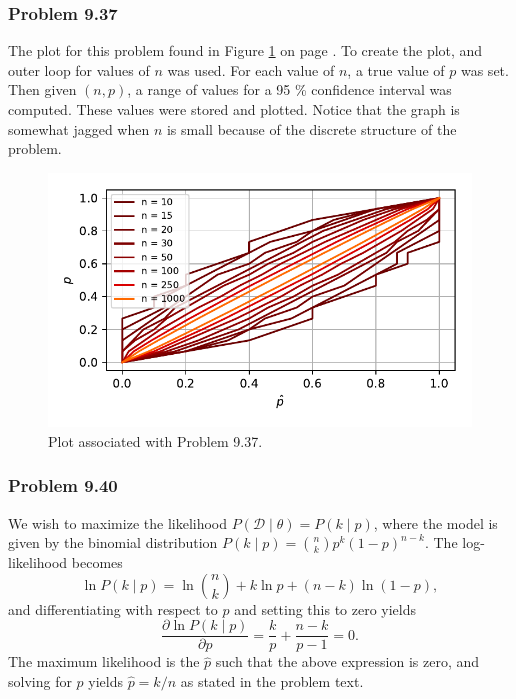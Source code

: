 \documentclass[12pt, a4paper]{article}
\newcommand{\D}{\mathcal{D}}
\begin{document}
{\subsubsection*{Problem 9.37}
The plot for this problem found in Figure \ref{fig:duda_ch9_prob37_k50} on page \pageref{fig:duda_ch9_prob37_k50}.
To create the plot, and outer loop for values of $n$ was used.
For each value of $n$, a true value of $p$ was set.
Then given $(n, p)$, a range of values for a 95 \% confidence interval was computed.
These values were stored and plotted.
Notice that the graph is somewhat jagged when $n$ is small because of the discrete structure of the problem.
	
\begin{figure}[ht!]
\centering
\includegraphics[width=0.7\linewidth]{figs/duda_ch9_prob37_k15}
\caption{Plot associated with Problem 9.37.}
\label{fig:duda_ch9_prob37_k50}
\end{figure}

\subsubsection*{Problem 9.40}
We wish to maximize the likelihood $P(\D \mid \theta) = P(k \mid p)$, where the model is given by the binomial distribution 
$P(k \mid p) = \binom{n}{k} p^k (1-p)^{n-k}$.
The log-likelihood becomes
\begin{equation*}
	\ln P(k \mid p) = \ln \binom{n}{k} + k \ln p + (n-k) \ln (1-p),
\end{equation*}
and differentiating with respect to $p$ and setting this to zero yields
\begin{equation*}
\frac{\partial \ln P(k \mid p)}{\partial p} = \frac{k}{p} + \frac{n-k}{p-1} = 0.
\end{equation*}
The maximum likelihood is the $\hat{p}$ such that the above expression is zero, and solving for $p$ yields $\hat{p} = k / n$ as stated in the problem text.


\clearpage
}
\end{document}

